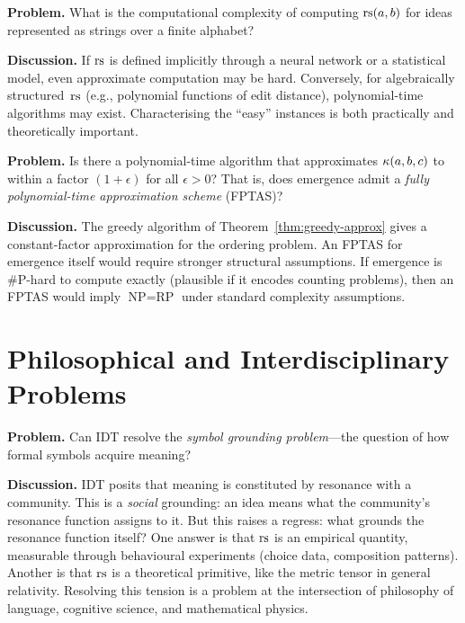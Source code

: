 \begin{game}
\label{op:resonance-complexity}
\textbf{Problem.}  What is the computational complexity of
computing $\mathrm{rs}(a,b)$ for ideas represented as strings over a
finite alphabet?

\textbf{Discussion.}  If $\mathrm{rs}$ is defined implicitly through
a neural network or a statistical model, even approximate
computation may be hard.  Conversely, for algebraically
structured~$\mathrm{rs}$ (e.g., polynomial functions of edit distance),
polynomial-time algorithms may exist.  Characterising the
``easy'' instances is both practically and theoretically
important.
\end{game}

\begin{game}
\label{op:approx-emergence}
\textbf{Problem.}  Is there a polynomial-time algorithm that
approximates $\kappa(a,b,c)$ to within a factor $(1+\epsilon)$
for all $\epsilon > 0$?  That is, does emergence admit a
\emph{fully polynomial-time approximation scheme} (FPTAS)?

\textbf{Discussion.}  The greedy algorithm of
Theorem~\ref{thm:greedy-approx} gives a constant-factor
approximation for the ordering problem.  An FPTAS for emergence
itself would require stronger structural assumptions.  If
emergence is \#P-hard to compute exactly (plausible if it encodes
counting problems), then an FPTAS would imply $\text{NP} =
\text{RP}$ under standard complexity assumptions.
\end{game}

\section{Philosophical and Interdisciplinary Problems}
\label{sec:open-philosophy}

\begin{game}
\label{op:grounding}
\textbf{Problem.}  Can IDT resolve the \emph{symbol grounding
problem}---the question of how formal symbols acquire meaning?

\textbf{Discussion.}  IDT posits that meaning is constituted by
resonance with a community.  This is a \emph{social} grounding:
an idea means what the community's resonance function assigns to it.
But this raises a regress: what grounds the resonance function
itself?  One answer is that $\mathrm{rs}$ is an empirical quantity,
measurable through behavioural experiments (choice data,
composition patterns).  Another is that $\mathrm{rs}$ is a theoretical
primitive, like the metric tensor in general relativity.
Resolving this tension is a problem at the intersection of
philosophy of language, cognitive science, and mathematical
physics.
\end{game}

